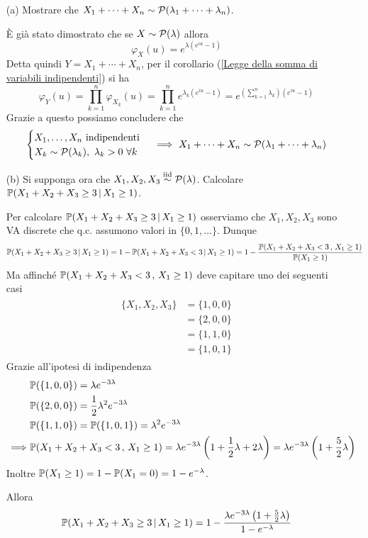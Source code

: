 \Soluzione{} %
\begin{itemize}
\item [(a)] Mostrare che $X_1+\cdots+X_n\sim\mathcal{P}(\lambda_1+\cdots+\lambda_n)$.

È già stato dimostrato che se $X\sim\mathcal{P}(\lambda)$ allora
\[
\varphi_X(u)=e^{\lambda(e^{iu}-1)}
\]
Detta quindi $Y=X_1+\cdots+X_n$, per il corollario (\ref{Legge della somma di variabili indipendenti}) si ha
\[
\varphi_Y(u)=\prod_{k=1}^n\varphi_{X_k}(u)=\prod_{k=1}^n e^{\lambda_k(e^{iu}-1)}=e^{\left(\sum_{k=1}^n \lambda_k  \right)\left(e^{iu}-1   \right)}
\]
Grazie a questo possiamo concludere che 
\[
\begin{cases}X_1,\dots,X_n\text{ indipendenti}\\X_k\sim\mathcal{P}(\lambda_k),\ \lambda_k>0\ \forall k\end{cases} \ \Longrightarrow\  X_1+\cdots+X_n\sim\mathcal{P}(\lambda_1+\cdots+\lambda_n)
\]

\item [(b)] Si supponga ora che $X_1,X_2,X_3\stackrel{\mathrm{iid}}{\sim}\mathcal{P}(\lambda)$. Calcolare $\mathbb{P}(X_1+X_2+X_3\geq 3\,|\,X_1\geq 1)$. 

Per calcolare $\mathbb{P}(X_1+X_2+X_3\geq 3\,|\,X_1\geq 1)$ osserviamo che $X_1,X_2,X_3$ sono VA discrete che q.c. assumono valori in $\{0,1,\dots  \}$. Dunque
\[
\mathbb{P}(X_1+X_2+X_3\geq 3\,|\,X_1\geq 1)=1-\mathbb{P}(X_1+X_2+X_3< 3\, | \,X_1\geq 1)=1-\frac{\mathbb{P}(X_1+X_2+X_3< 3\, , \,X_1\geq 1)}{\mathbb{P}(X_1\geq 1)}
\]
Ma affinché $\mathbb{P}(X_1+X_2+X_3< 3\, , \,X_1\geq 1)$ deve capitare uno dei seguenti casi
\begin{gather*}
\begin{aligned}
\{ X_1,X_2,X_3\}&=\{1,0,0  \} \\
&=\{2,0,0  \} \\
&=\{1,1,0  \} \\
&=\{ 1,0,1 \}
\end{aligned}
\end{gather*}
Grazie all'ipotesi di indipendenza
\begin{gather*}
\begin{aligned}
&\mathbb{P}(\{1,0,0  \})=\lambda e^{-3\lambda} \\
&\mathbb{P}(\{2,0,0  \})=\frac{1}{2}\lambda^2 e^{-3\lambda} \\
&\mathbb{P}(\{1,1,0  \})=\mathbb{P}(\{ 1,0,1 \})=\lambda^2 e^{-3\lambda} \\
\ \Longrightarrow\  & \mathbb{P}(X_1+X_2+X_3< 3\, , \,X_1\geq 1)=\lambda e^{-3\lambda}\left(1+\frac{1}{2}\lambda +2\lambda   \right)=\lambda e^{-3\lambda}\left(1+\frac{5}{2}\lambda  \right)
\end{aligned}
\end{gather*}
Inoltre $\mathbb{P}(X_1\geq 1)=1-\mathbb{P}(X_1=0)=1-e^{-\lambda}$.

Allora
\[
\mathbb{P}(X_1+X_2+X_3\geq 3\,|\,X_1\geq 1)=1-\frac{\lambda e^{-3\lambda}\left(1+\frac{5}{2}\lambda\right)}{1-e^{-\lambda}}
\]

\end{itemize}

